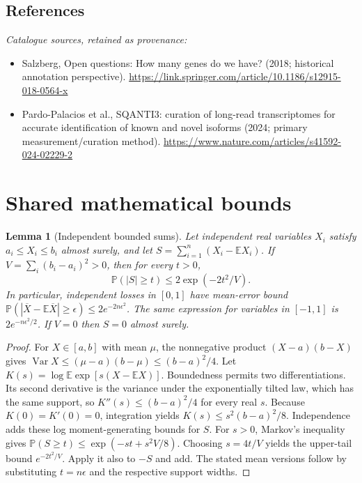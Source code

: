 \documentclass[11pt]{article}
\newcommand{\E}{\mathbb E}
\newcommand{\Prob}{\mathbb P}
\DeclareMathOperator{\Var}{Var}
\providecommand{\E}{\mathbb E}
\providecommand{\Prob}{\mathbb P}
\providecommand{\Var}{\operatorname{Var}}
\newtheorem{sharedlemma}{Lemma}[section]
\begin{document}
\subsection{References}
\noindent\emph{Catalogue sources, retained as provenance:}
\begin{itemize}
\item Salzberg, Open questions: How many genes do we have? (2018; historical annotation perspective). \url{https://link.springer.com/article/10.1186/s12915-018-0564-x}
\item Pardo-Palacios et al., SQANTI3: curation of long-read transcriptomes for accurate identification of known and novel isoforms (2024; primary measurement/curation method). \url{https://www.nature.com/articles/s41592-024-02229-2}
\end{itemize}
\clearpage


\appendix
\section{Shared mathematical bounds}\label{app:bounds}
\begin{sharedlemma}[Independent bounded sums]\label{lem:bounded}
Let independent real variables $X_i$ satisfy $a_i\leq X_i\leq b_i$ almost surely,
and let $S=\sum_{i=1}^n(X_i-\E X_i)$. If
$V=\sum_i(b_i-a_i)^2>0$, then for every $t>0$,
\[
 \Prob(|S|\geq t)\leq 2\exp(-2t^2/V).
\]
In particular, independent losses in $[0,1]$ have mean-error bound
$\Prob(|\overline X-\E\overline X|\geq\epsilon)
\leq2e^{-2n\epsilon^2}$. The same expression for variables in $[-1,1]$
is $2e^{-n\epsilon^2/2}$. If $V=0$ then $S=0$ almost surely.
\end{sharedlemma}
\begin{proof}
For $X\in[a,b]$ with mean $\mu$, the nonnegative product
$(X-a)(b-X)$ gives
$\Var X\leq(\mu-a)(b-\mu)\leq(b-a)^2/4$.
Let $K(s)=\log\E\exp[s(X-\E X)]$.
Boundedness permits two differentiations. Its second derivative is the variance
under the exponentially tilted law, which has the same support, so
$K''(s)\leq(b-a)^2/4$ for every real $s$.
Because $K(0)=K'(0)=0$, integration yields
$K(s)\leq s^2(b-a)^2/8$.
Independence adds these log moment-generating bounds for $S$.
For $s>0$, Markov's inequality gives
$\Prob(S\geq t)\leq\exp(-st+s^2V/8)$.
Choosing $s=4t/V$ yields the upper-tail bound $e^{-2t^2/V}$.
Apply it also to $-S$ and add. The stated mean versions follow by substituting
$t=n\epsilon$ and the respective support widths.
\end{proof}
\end{document}
